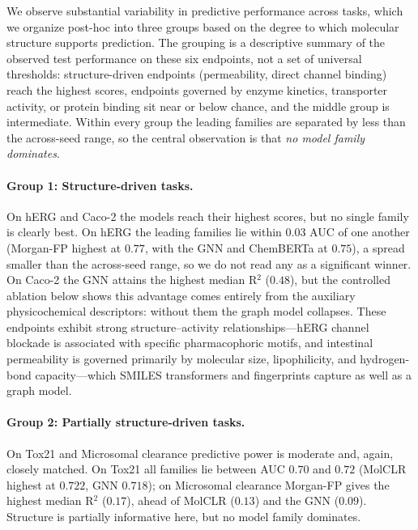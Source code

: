 \documentclass[journal]{IEEEtran}
\begin{document}
We observe substantial variability in predictive performance across tasks, which we organize post-hoc into three groups based on the degree to which molecular structure supports prediction. The grouping is a descriptive summary of the observed test performance on these six endpoints, not a set of universal thresholds: structure-driven endpoints (permeability, direct channel binding) reach the highest scores, endpoints governed by enzyme kinetics, transporter activity, or protein binding sit near or below chance, and the middle group is intermediate. Within every group the leading families are separated by less than the across-seed range, so the central observation is that \emph{no model family dominates}.

\paragraph{Group 1: Structure-driven tasks.}
On hERG and Caco-2 the models reach their highest scores, but no single family is clearly best. On hERG the leading families lie within $0.03$ AUC of one another (Morgan-FP highest at $0.77$, with the GNN and ChemBERTa at $0.75$), a spread smaller than the across-seed range, so we do not read any as a significant winner. On Caco-2 the GNN attains the highest median R$^2$ ($0.48$), but the controlled ablation below shows this advantage comes entirely from the auxiliary physicochemical descriptors: without them the graph model collapses. These endpoints exhibit strong structure--activity relationships---hERG channel blockade is associated with specific pharmacophoric motifs, and intestinal permeability is governed primarily by molecular size, lipophilicity, and hydrogen-bond capacity---which SMILES transformers and fingerprints capture as well as a graph model.

\paragraph{Group 2: Partially structure-driven tasks.}
On Tox21 and Microsomal clearance predictive power is moderate and, again, closely matched. On Tox21 all families lie between AUC $0.70$ and $0.72$ (MolCLR highest at $0.722$, GNN $0.718$); on Microsomal clearance Morgan-FP gives the highest median R$^2$ ($0.17$), ahead of MolCLR ($0.13$) and the GNN ($0.09$). Structure is partially informative here, but no model family dominates.
\end{document}
